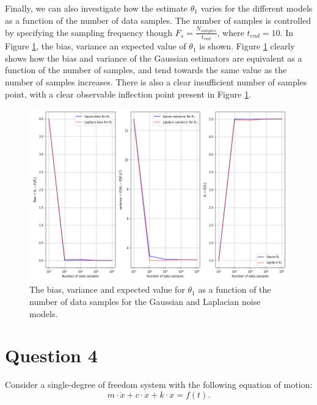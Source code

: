 \documentclass{article}
\begin{document}
Finally, we can also investigate how the estimate $\hat{\theta}_1$ varies for the different models as a function of the number of data samples. The number of samples is controlled by specifying the sampling frequency though $F_s = \frac{N_{samples}}{t_{end}}$, where $t_{end} = 10$. In Figure \ref{fig:Q3c_3}, the bias, variance an expected value of $\theta_1$ is shown. Figure \ref{fig:Q3c_3} clearly shows how the bias and variance of the Gaussian estimators are equivalent as a function of the number of samples, and tend towards the same value as the number of samples increases. There is also a clear insufficient number of samples point, with a clear observable inflection point present in Figure \ref{fig:Q3c_3}.
\begin{figure}[!htb]
    \centering
    \includegraphics[scale = 0.5]{Q3c_fig6.png}
    \caption{The bias, variance and expected value for $\theta_1$ as a function of the number of data samples for the Gaussian and Laplacian noise models.}
    \label{fig:Q3c_3}
\end{figure}

\clearpage

\section{Question 4}

Consider a single-degree of freedom system with the following equation of motion:
\begin{equation}\label{eq:linear_system_eq}
m \cdot \ddot{x} + c \cdot \dot{x} + k \cdot x = f(t).
\end{equation}
\end{document}
